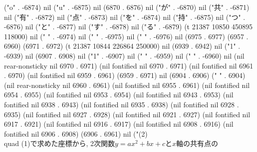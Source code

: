 ("o" . -6874) nil ("u" . -6875) nil (6870 . 6876) nil ("が" . -6870) nil ("共" . -6871) nil ("有" . -6872) nil ("点" . -6873) nil ("を" . -6874) nil ("持" . -6875) nil ("つ" . -6876) nil ("と" . -6877) nil ("す" . -6878) nil ("る" . -6879) (t 21387 10850 450895 118000) nil ("
" . -6974) nil (" " . -6975) nil (" " . -6976) nil (6975 . 6977) (6957 . 6960) (6971 . 6972) (t 21387 10844 226864 250000) nil (6939 . 6942) nil ("1" . -6939) nil (6907 . 6908) nil ("1" . -6907) nil (" " . -6959) nil (" " . -6960) nil (nil rear-nonsticky nil 6970 . 6971) (nil fontified nil 6970 . 6971) (nil fontified nil 6961 . 6970) (nil fontified nil 6959 . 6961) (6959 . 6971) nil (6904 . 6906) ("    " . 6904) (nil rear-nonsticky nil 6960 . 6961) (nil fontified nil 6955 . 6961) (nil fontified nil 6954 . 6955) (nil fontified nil 6953 . 6954) (nil fontified nil 6943 . 6953) (nil fontified nil 6938 . 6943) (nil fontified nil 6935 . 6938) (nil fontified nil 6928 . 6935) (nil fontified nil 6927 . 6928) (nil fontified nil 6921 . 6927) (nil fontified nil 6917 . 6921) (nil fontified nil 6916 . 6917) (nil fontified nil 6908 . 6916) (nil fontified nil 6906 . 6908) (6906 . 6961) nil ("(2)\\quad (1)で求めた座標から, 2次関数$y=ax^{2}+bx+c$と$x$軸の共有点の
